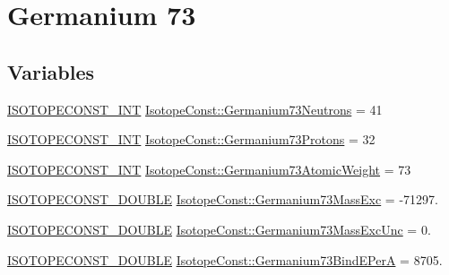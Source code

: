 \hypertarget{group___isotope_const-_germanium-_ge73}{}\section{Germanium 73}
\label{group___isotope_const-_germanium-_ge73}
\subsection*{Variables}
\begin{DoxyCompactItemize}
\item 
\mbox{\hyperlink{group___isotope_const-_macros_ga5f18360b3e99483a35c32d789e62621c}{I\+S\+O\+T\+O\+P\+E\+C\+O\+N\+S\+T\+\_\+\+I\+NT}} \mbox{\hyperlink{group___isotope_const-_germanium-_ge73_ga891b2334320ad7d526286fdf3f5ec279}{Isotope\+Const\+::\+Germanium73\+Neutrons}} = 41
\item 
\mbox{\hyperlink{group___isotope_const-_macros_ga5f18360b3e99483a35c32d789e62621c}{I\+S\+O\+T\+O\+P\+E\+C\+O\+N\+S\+T\+\_\+\+I\+NT}} \mbox{\hyperlink{group___isotope_const-_germanium-_ge73_ga28bfaad594c89b65206c3a7405810120}{Isotope\+Const\+::\+Germanium73\+Protons}} = 32
\item 
\mbox{\hyperlink{group___isotope_const-_macros_ga5f18360b3e99483a35c32d789e62621c}{I\+S\+O\+T\+O\+P\+E\+C\+O\+N\+S\+T\+\_\+\+I\+NT}} \mbox{\hyperlink{group___isotope_const-_germanium-_ge73_gabdd7a389fff0539b8e15b76e0ee2e50d}{Isotope\+Const\+::\+Germanium73\+Atomic\+Weight}} = 73
\item 
\mbox{\hyperlink{group___isotope_const-_macros_ga8f45a7272ce02c0b4c65c44636ed719a}{I\+S\+O\+T\+O\+P\+E\+C\+O\+N\+S\+T\+\_\+\+D\+O\+U\+B\+LE}} \mbox{\hyperlink{group___isotope_const-_germanium-_ge73_gaa6b17c4668b74b31dde7181dbd019a4d}{Isotope\+Const\+::\+Germanium73\+Mass\+Exc}} = -\/71297.
\item 
\mbox{\hyperlink{group___isotope_const-_macros_ga8f45a7272ce02c0b4c65c44636ed719a}{I\+S\+O\+T\+O\+P\+E\+C\+O\+N\+S\+T\+\_\+\+D\+O\+U\+B\+LE}} \mbox{\hyperlink{group___isotope_const-_germanium-_ge73_ga11702656446f4ba7c45f8c026542d6e8}{Isotope\+Const\+::\+Germanium73\+Mass\+Exc\+Unc}} = 0.
\item 
\mbox{\hyperlink{group___isotope_const-_macros_ga8f45a7272ce02c0b4c65c44636ed719a}{I\+S\+O\+T\+O\+P\+E\+C\+O\+N\+S\+T\+\_\+\+D\+O\+U\+B\+LE}} \mbox{\hyperlink{group___isotope_const-_germanium-_ge73_gac28800ea3abc96fa5ad7c13a7cf3731f}{Isotope\+Const\+::\+Germanium73\+Bind\+E\+PerA}} = 8705.
\item 

\end{DoxyCompactItemize}
